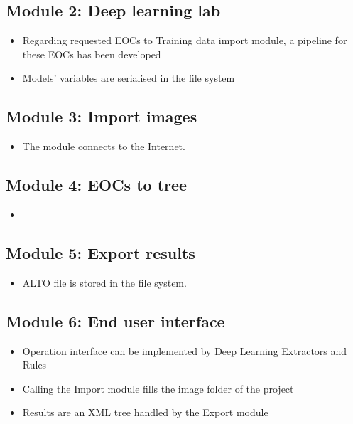 \documentclass{polytech/polytech}
\numberwithin{figure}{chapter}
\begin{document}
\begin{appendix}
\subsection{Module 2: Deep learning lab}

\begin{itemize}
\item Regarding requested EOCs to Training data import module, a pipeline for these EOCs has been developed
\item Models’ variables are serialised in the file system
\end{itemize}

\subsection{Module 3: Import images}

\begin{itemize}
\item The module connects to the Internet.
\end{itemize}

\subsection{Module 4: EOCs to tree}

\begin{itemize}
\item 
\end{itemize}

\subsection{Module 5: Export results}

\begin{itemize}
\item ALTO file is stored in the file system.
\end{itemize}

\subsection{Module 6: End user interface}

\begin{itemize}
\item Operation interface can be implemented by Deep Learning Extractors and Rules
\item Calling the Import module fills the image folder of the project
\item Results are an XML tree handled by the Export module
\end{itemize}


\end{appendix}
\end{document}

